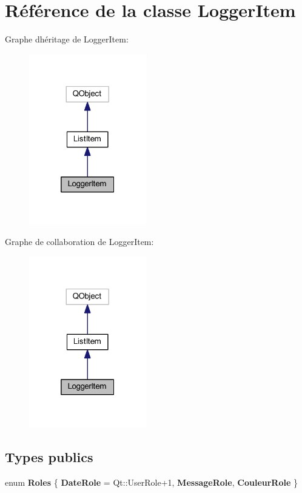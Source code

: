 \hypertarget{class_logger_item}{}\section{Référence de la classe Logger\+Item}
\label{class_logger_item}


Graphe d\textquotesingle{}héritage de Logger\+Item\+:
\nopagebreak
\begin{figure}[H]
\begin{center}
\leavevmode
\includegraphics[width=145pt]{class_logger_item__inherit__graph}
\end{center}
\end{figure}


Graphe de collaboration de Logger\+Item\+:
\nopagebreak
\begin{figure}[H]
\begin{center}
\leavevmode
\includegraphics[width=145pt]{class_logger_item__coll__graph}
\end{center}
\end{figure}
\subsection*{Types publics}
\begin{DoxyCompactItemize}
\item 
enum {\bfseries Roles} \{ {\bfseries Date\+Role} = Qt\+:\+:User\+Role+1, 
{\bfseries Message\+Role}, 
{\bfseries Couleur\+Role}
 \}\hypertarget{class_logger_item_a3716eebdcb8cced946f66d3a28d5cc34}{}\label{class_logger_item_a3716eebdcb8cced946f66d3a28d5cc34}

\end{DoxyCompactItemize}
